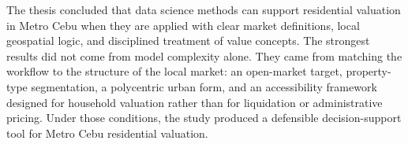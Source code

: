 The thesis concluded that data science methods can support residential valuation in Metro Cebu when they are applied with clear market definitions, local geospatial logic, and disciplined treatment of value concepts. The strongest results did not come from model complexity alone. They came from matching the workflow to the structure of the local market: an open-market target, property-type segmentation, a polycentric urban form, and an accessibility framework designed for household valuation rather than for liquidation or administrative pricing. Under those conditions, the study produced a defensible decision-support tool for Metro Cebu residential valuation.
